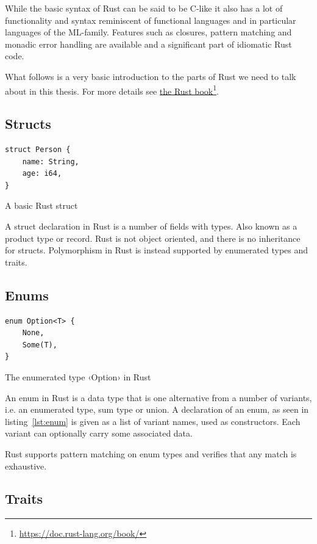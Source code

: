 While the basic syntax of Rust can be said to be C-like it also has a lot of functionality and syntax reminiscent of functional languages and in particular languages of the ML-family. Features such as closures, pattern matching and monadic error handling are available and a significant part of idiomatic Rust code.

What follows is a very basic introduction to the parts of Rust we need to talk about in this thesis. For more details see \href{https://doc.rust-lang.org/book/}{the Rust book}\footnote{\url{https://doc.rust-lang.org/book/}}.

\subsection{Structs}

\begin{listing}[ht!]
\begin{verbatim}
struct Person {
    name: String,
    age: i64,
}
\end{verbatim}
\caption{A basic Rust struct}
\label{lst:struct}
\end{listing}

A struct declaration in Rust is a number of fields with types. Also known as a product type or record. Rust is not object oriented, and there is no inheritance for structs. Polymorphism in Rust is instead supported by enumerated types and traits.

\subsection{Enums}

\begin{listing}[ht!]
\begin{verbatim}
enum Option<T> {
    None,
    Some(T),
}
\end{verbatim}
\caption{The enumerated type ‹Option› in Rust}
\label{lst:enum}
\end{listing}

An enum in Rust is a data type that is one alternative from a number of variants, i.e. an enumerated type, sum type or union. A declaration of an enum, as seen in listing~\ref{lst:enum} is given as a list of variant names, used as constructors. Each variant can optionally carry some associated data.

Rust supports pattern matching on enum types and verifies that any match is exhaustive.

\subsection{Traits}
\label{sec:traits}

